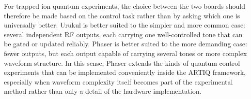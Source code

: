 For trapped-ion quantum experiments, the choice between the two boards should therefore be made based on the control task rather than by asking which one is universally better. Urukul is better suited to the simpler and more common case: several independent RF outputs, each carrying one well-controlled tone that can be gated or updated reliably. Phaser is better suited to the more demanding case: fewer outputs, but each output capable of carrying several tones or more complex waveform structure. In this sense, Phaser extends the kinds of quantum-control experiments that can be implemented conveniently inside the ARTIQ framework, especially when waveform complexity itself becomes part of the experimental method rather than only a detail of the hardware implementation.
